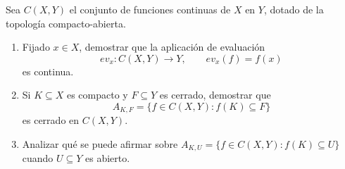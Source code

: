 \documentclass{article}
\theoremstyle{definition}
\newenvironment{ejercicio}[1]{\begin{trivlist}
\item[\hskip \labelsep {\bfseries Ejercicio}\hskip \labelsep {\bfseries #1.}]}{\end{trivlist}}
\begin{document}
\begin{ejercicio}{18}
    Sea \(C(X,Y)\) el conjunto de funciones continuas de \(X\) en \(Y\), dotado de la topología compacto-abierta.
    \begin{enumerate}
        \item Fijado \(x \in X\), demostrar que la aplicación de evaluación
        \[
            ev_x : C(X,Y) \to Y, \qquad ev_x(f) = f(x)
        \]
        es continua.
        \item Si \(K \subseteq X\) es compacto y \(F \subseteq Y\) es cerrado, demostrar que
        \[
            A_{K,F} = \{f \in C(X,Y) : f(K) \subseteq F\}
        \]
        es cerrado en \(C(X,Y)\).
        \item Analizar qué se puede afirmar sobre \(A_{K,U} = \{f \in C(X,Y) : f(K) \subseteq U\}\) cuando \(U \subseteq Y\) es abierto.
    \end{enumerate}
\end{ejercicio}
\end{document}
